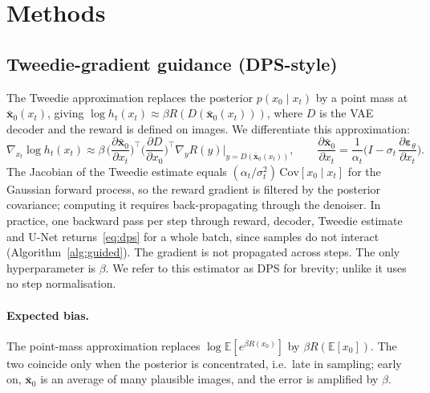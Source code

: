 \documentclass[11pt]{article}
\newcommand{\E}{\mathbb{E}}
\newcommand{\xb}{\bar{\bm{x}}}
\newcommand{\eps}{\bm{\varepsilon}}
\begin{document}
\section{Methods}
\label{sec:methods}

\subsection{Tweedie-gradient guidance (DPS-style)}
\label{sec:dps}
The Tweedie approximation replaces the posterior $p(x_0\mid x_t)$ by a point mass at $\xb_0(x_t)$, giving $\log h_t(x_t)\approx \beta R(D(\xb_0(x_t)))$, where $D$ is the VAE decoder and the reward is defined on images. We differentiate this approximation:
\begin{equation}
\nabla_{x_t}\log h_t(x_t) \approx \beta\,\Big(\frac{\partial \xb_0}{\partial x_t}\Big)^{\!\top}\Big(\frac{\partial D}{\partial x_0}\Big)^{\!\top}\nabla_y R(y)\Big|_{y=D(\xb_0(x_t))},
\qquad
\frac{\partial \xb_0}{\partial x_t} = \frac{1}{\alpha_t}\Big(I - \sigma_t\,\frac{\partial \eps_\theta}{\partial x_t}\Big).
\label{eq:dps}
\end{equation}
The Jacobian of the Tweedie estimate equals $(\alpha_t/\sigma_t^2)\,\mathrm{Cov}[x_0\mid x_t]$ for the Gaussian forward process, so the reward gradient is filtered by the posterior covariance; computing it requires back-propagating through the denoiser. In practice, one backward pass per step through reward, decoder, Tweedie estimate and U-Net returns~\eqref{eq:dps} for a whole batch, since samples do not interact (Algorithm~\ref{alg:guided}). The gradient is not propagated across steps. The only hyperparameter is $\beta$. We refer to this estimator as DPS for brevity; unlike \citet{chung2023dps} it uses no step normalisation.

\paragraph{Expected bias.}
The point-mass approximation replaces $\log\E[e^{\beta R(x_0)}]$ by $\beta R(\E[x_0])$. The two coincide only when the posterior is concentrated, i.e.\ late in sampling; early on, $\xb_0$ is an average of many plausible images, and the error is amplified by $\beta$.
\end{document}
